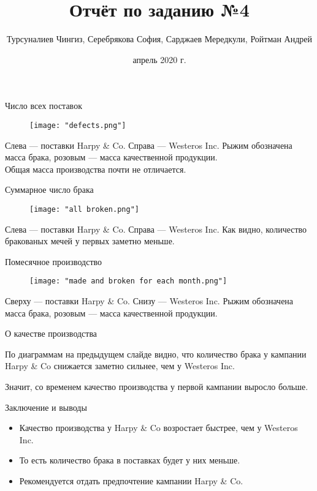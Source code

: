 \documentclass[10pt, pdf, hyperref={unicode}]{beamer}
\title{Отчёт по заданию №4}
\author{Турсуналиев Чингиз, Серебрякова София, Сарджаев Мередкули, Ройтман Андрей}
\date{апрель 2020 г.}
\begin{document}
	\begin{frame}
		\titlepage
	\end{frame}

	\begin{frame}{Число всех поставок}
		\begin{figure}
			\texttt{[image: "defects.png"]}
			\centering
		\end{figure}
		Слева — поставки Harpy \& Co. Справа — Westeros Inc.
		Рыжим обозначена масса брака, розовым — масса качественной продукции.\\
		Общая масса производства почти не отличается.
		
	\end{frame}

	\begin{frame}{Суммарное число брака}		
		\begin{figure}
			\texttt{[image: "all broken.png"]}
			\centering
		\end{figure}
		
		Слева — поставки Harpy \& Co. Справа — Westeros Inc.
		Как видно, количество бракованых мечей у первых заметно меньше.
	\end{frame}

	\begin{frame}{Помесячное производство}
		\begin{figure}
			\texttt{[image: "made and broken for each month.png"]}
			\centering
		\end{figure}
	
		Сверху — поставки Harpy \& Co. Снизу — Westeros Inc. Рыжим обозначена масса брака, розовым — масса качественной продукции.
	\end{frame}

	\begin{frame}{О качестве производства}
		\begin{block}{}
			По диаграммам на предыдущем слайде видно, что количество брака у кампании Harpy \& Co снижается заметно сильнее, чем у Westeros Inc.
		\end{block}
	
		\begin{block}{}
			Значит, со временем качество производства у первой кампании выросло больше.
		\end{block}
	\end{frame}

	\begin{frame}{Заключение и выводы}
		\begin{itemize}
			\item Качество производства у Harpy \& Co возростает быстрее, чем у Westeros Inc.
			
			\item То есть количество брака в поставках будет у них меньше.
			
			\item Рекомендуется отдать предпочтение кампании Harpy \& Co.
		\end{itemize}
	\end{frame}
\end{document}
